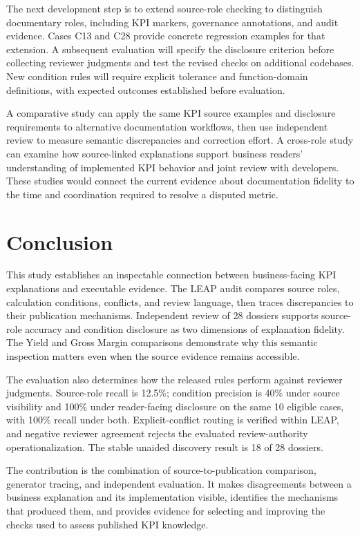 \documentclass[a4paper,fleqn]{cas-dc}
\begin{document}
The next development step is to extend source-role checking to distinguish documentary roles, including KPI markers, governance annotations, and audit evidence. Cases C13 and C28 provide concrete regression examples for that extension. A subsequent evaluation will specify the disclosure criterion before collecting reviewer judgments and test the revised checks on additional codebases. New condition rules will require explicit tolerance and function-domain definitions, with expected outcomes established before evaluation.

A comparative study can apply the same KPI source examples and disclosure requirements to alternative documentation workflows, then use independent review to measure semantic discrepancies and correction effort. A cross-role study can examine how source-linked explanations support business readers' understanding of implemented KPI behavior and joint review with developers. These studies would connect the current evidence about documentation fidelity to the time and coordination required to resolve a disputed metric.

\section{Conclusion}
This study establishes an inspectable connection between business-facing KPI explanations and executable evidence. The LEAP audit compares source roles, calculation conditions, conflicts, and review language, then traces discrepancies to their publication mechanisms. Independent review of 28 dossiers supports source-role accuracy and condition disclosure as two dimensions of explanation fidelity. The Yield and Gross Margin comparisons demonstrate why this semantic inspection matters even when the source evidence remains accessible.

The evaluation also determines how the released rules perform against reviewer judgments. Source-role recall is 12.5\%; condition precision is 40\% under source visibility and 100\% under reader-facing disclosure on the same 10 eligible cases, with 100\% recall under both. Explicit-conflict routing is verified within LEAP, and negative reviewer agreement rejects the evaluated review-authority operationalization. The stable unaided discovery result is 18 of 28 dossiers.

The contribution is the combination of source-to-publication comparison, generator tracing, and independent evaluation. It makes disagreements between a business explanation and its implementation visible, identifies the mechanisms that produced them, and provides evidence for selecting and improving the checks used to assess published KPI knowledge.
\end{document}
